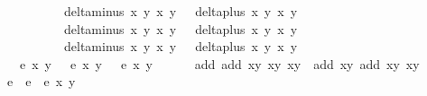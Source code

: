 \begin{isabellebody}
\ \ \ \ \ \ \ \ \ \ {\isachardoublequoteopen}delta{\isacharunderscore}minus\ x{}\ y{}\ x{}\ y{}\ {\isasymnoteq}\ {}{\isachardoublequoteclose}\ {\isachardoublequoteopen}delta{\isacharunderscore}plus\ x{}\ y{}\ x{}\ y{}\ {\isasymnoteq}\ {}{\isachardoublequoteclose}\isanewline
\ \ \ \ \ \ \ \ \ \ {\isachardoublequoteopen}delta{\isacharunderscore}minus\ x{}{\isacharprime}\ y{}{\isacharprime}\ x{}\ y{}\ {\isasymnoteq}\ {}{\isachardoublequoteclose}\ {\isachardoublequoteopen}delta{\isacharunderscore}plus\ x{}{\isacharprime}\ y{}{\isacharprime}\ x{}\ y{}\ {\isasymnoteq}\ {}{\isachardoublequoteclose}\isanewline
\ \ \ \ \ \ \ \ \ \ {\isachardoublequoteopen}delta{\isacharunderscore}minus\ x{}\ y{}\ x{}{\isacharprime}\ y{}{\isacharprime}\ {\isasymnoteq}\ {}{\isachardoublequoteclose}\ {\isachardoublequoteopen}delta{\isacharunderscore}plus\ x{}\ y{}\ x{}{\isacharprime}\ y{}{\isacharprime}\ {\isasymnoteq}\ {}{\isachardoublequoteclose}\isanewline
\ \ \ {\isachardoublequoteopen}e\ x{}\ y{}\ {\isacharequal}\ {}{\isachardoublequoteclose}\ {\isachardoublequoteopen}e\ x{}\ y{}\ {\isacharequal}\ {}{\isachardoublequoteclose}\ {\isachardoublequoteopen}e\ x{}\ y{}\ {\isacharequal}\ {}{\isachardoublequoteclose}\ \isanewline
\ \ \ {\isachardoublequoteopen}add\ {\isacharparenleft}add\ {\isacharparenleft}x{}{\isacharcomma}y{}{\isacharparenright}\ {\isacharparenleft}x{}{\isacharcomma}y{}{\isacharparenright}{\isacharparenright}\ {\isacharparenleft}x{}{\isacharcomma}y{}{\isacharparenright}\ {\isacharequal}\ add\ {\isacharparenleft}x{}{\isacharcomma}y{}{\isacharparenright}\ {\isacharparenleft}add\ {\isacharparenleft}x{}{\isacharcomma}y{}{\isacharparenright}\ {\isacharparenleft}x{}{\isacharcomma}y{}{\isacharparenright}{\isacharparenright}{\isachardoublequoteclose}\ \isanewline
%
\isadelimproof
%
\endisadelimproof
%
\isatagproof
{}\isamarkupfalse%
\ {\isacharminus}\isanewline
\ \isamarkupfalse%
\ e{}\ \ {\isachardoublequoteopen}e{}\ {\isacharequal}\ e\ x{}\ y{}{\isachardoublequoteclose}\isanewline

\end{isabellebody}
